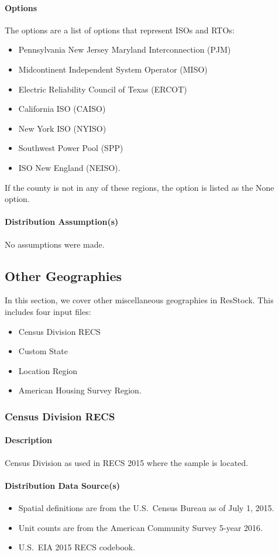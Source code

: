 \paragraph{Options}
The options are a list of options that represent ISOs and RTOs:
\begin{itemize}
    \item Pennsylvania New Jersey Maryland Interconnection (PJM)
    \item Midcontinent Independent System Operator (MISO)
    \item Electric Reliability Council of Texas (ERCOT)
    \item California ISO (CAISO)
    \item New York ISO (NYISO)
    \item Southwest Power Pool (SPP)
    \item ISO New England (NEISO).
\end{itemize}
If the county is not in any of these regions, the option is listed as the None option.

\paragraph{Distribution Assumption(s)}
No assumptions were made.

\subsection{Other Geographies}

In this section, we cover other miscellaneous geographies in ResStock. This includes four input files:
\begin{itemize}
    \item Census Division RECS
    \item Custom State
    \item Location Region
    \item American Housing Survey Region.
\end{itemize}

\subsubsection{Census Division RECS}
\paragraph{Description}
Census Division as used in RECS 2015 where the sample is located.

\paragraph{Distribution Data Source(s)}
\begin{itemize}
    \item Spatial definitions are from the U.S.~Census Bureau as of July 1, 2015.
    \item Unit counts are from the American Community Survey 5-year 2016.
    \item U.S.~EIA 2015 RECS codebook.
\end{itemize}

